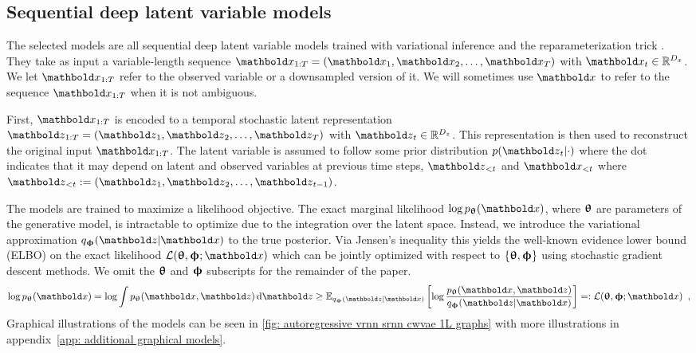 \subsection{Sequential deep latent variable models}
The selected models are all sequential deep latent variable models trained with variational inference and the reparameterization trick \cite{kingma_autoencoding_2014}.
They take as input a variable-length sequence $\xb_{1:T} = \left(\xb_1, \xb_2, \dots, \xb_{T}\right)$ with $\xb_t \in \mathbb{R}^{D_x}$. 
We let $\xb_{1:T}$ refer to the observed variable or a downsampled version of it. We will sometimes use $\xb$ to refer to the sequence $\xb_{1:T}$ when it is not ambiguous.

First, $\xb_{1:T}$ is encoded to a temporal stochastic latent representation $\zb_{1:T} = \left( \zb_1, \zb_2, \dots, \zb_{T} \right)$ with $\zb_t\in \mathbb{R}^{D_z}$. This representation is then used to reconstruct the original input $\xb_{1:T}$.
The latent variable is assumed to follow some prior distribution $p(\zb_t|\cdot)$ where the dot indicates that it may depend on latent and observed variables at previous time steps, $\zb_{<t}$ and $\xb_{<t}$ where $\zb_{<t} := \left( \zb_1, \zb_2, \dots, \zb_{t-1} \right)$. 

The models are trained to maximize a likelihood objective. The exact marginal likelihood $\log p_\thetab(\xb)$, where ${\boldsymbol{\uptheta}}$ are parameters of the generative model, is intractable to optimize due to the integration over the latent space. Instead, we introduce the variational approximation $q_\phib(\zb|\xb)$ to the true posterior. Via Jensen's inequality this yields the well-known evidence lower bound (ELBO) on the exact likelihood $\mathcal{L}(\thetab,\phib;\xb)$
which can be jointly optimized with respect to  $\{{\boldsymbol{\uptheta}}, {\boldsymbol{\upphi}}\}$ using stochastic gradient descent methods. We omit the ${\boldsymbol{\uptheta}}$ and ${\boldsymbol{\upphi}}$ subscripts for the remainder of the paper.
\begin{equation}
    \log p_\thetab(\xb) = \log \int p_\thetab(\xb,\zb) \, \mathrm{d}\zb  \geq \mathbb{E}_{q_\phib(\zb|\xb)} \left[ \log \frac{p_\thetab(\xb,\zb)}{q_\phib(\zb|\xb)} \right] =: \mathcal{L}(\thetab,\phib;\xb) \label{eq: elbo} \enspace,
\end{equation}
Graphical illustrations of the models can be seen in \cref{fig: autoregressive vrnn srnn cwvae 1L graphs} with more illustrations in appendix~\cref{app: additional graphical models}.


